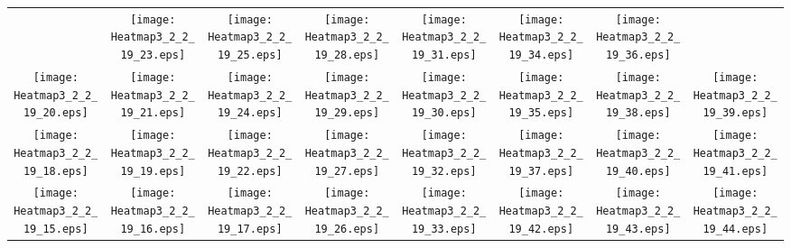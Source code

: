 \documentclass{standalone}
\begin{document}
\renewcommand{\arraystretch}{0}
\setlength{\tabcolsep}{0pt}
\begin{tabular}{ *8{c} }
 & \texttt{[image: Heatmap3\_2\_2\_19\_23.eps]} & \texttt{[image: Heatmap3\_2\_2\_19\_25.eps]} & \texttt{[image: Heatmap3\_2\_2\_19\_28.eps]} & \texttt{[image: Heatmap3\_2\_2\_19\_31.eps]} & \texttt{[image: Heatmap3\_2\_2\_19\_34.eps]} & \texttt{[image: Heatmap3\_2\_2\_19\_36.eps]} &  \\
\texttt{[image: Heatmap3\_2\_2\_19\_20.eps]} & \texttt{[image: Heatmap3\_2\_2\_19\_21.eps]} & \texttt{[image: Heatmap3\_2\_2\_19\_24.eps]} & \texttt{[image: Heatmap3\_2\_2\_19\_29.eps]} & \texttt{[image: Heatmap3\_2\_2\_19\_30.eps]} & \texttt{[image: Heatmap3\_2\_2\_19\_35.eps]} & \texttt{[image: Heatmap3\_2\_2\_19\_38.eps]} & \texttt{[image: Heatmap3\_2\_2\_19\_39.eps]} \\
\texttt{[image: Heatmap3\_2\_2\_19\_18.eps]} & \texttt{[image: Heatmap3\_2\_2\_19\_19.eps]} & \texttt{[image: Heatmap3\_2\_2\_19\_22.eps]} & \texttt{[image: Heatmap3\_2\_2\_19\_27.eps]} & \texttt{[image: Heatmap3\_2\_2\_19\_32.eps]} & \texttt{[image: Heatmap3\_2\_2\_19\_37.eps]} & \texttt{[image: Heatmap3\_2\_2\_19\_40.eps]} & \texttt{[image: Heatmap3\_2\_2\_19\_41.eps]} \\
\texttt{[image: Heatmap3\_2\_2\_19\_15.eps]} & \texttt{[image: Heatmap3\_2\_2\_19\_16.eps]} & \texttt{[image: Heatmap3\_2\_2\_19\_17.eps]} & \texttt{[image: Heatmap3\_2\_2\_19\_26.eps]} & \texttt{[image: Heatmap3\_2\_2\_19\_33.eps]} & \texttt{[image: Heatmap3\_2\_2\_19\_42.eps]} & \texttt{[image: Heatmap3\_2\_2\_19\_43.eps]} & \texttt{[image: Heatmap3\_2\_2\_19\_44.eps]} \\

\end{tabular}
\end{document}
